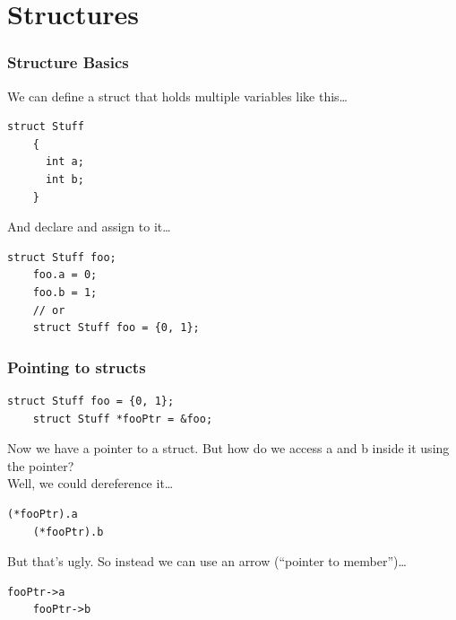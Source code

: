 \documentclass{beamer}
\begin{document}
\section{Structures}
\begin{frame}[fragile] %
  \frametitle{Structure Basics}
  We can define a struct that holds multiple variables like this\dots
  \begin{lstlisting}[style=customc]
    struct Stuff
    {
      int a;
      int b;
    }
  \end{lstlisting}
  \pause
  And declare and assign to it\dots
  \begin{lstlisting}[style=customc]
    struct Stuff foo;
    foo.a = 0;
    foo.b = 1;
    // or
    struct Stuff foo = {0, 1};
  \end{lstlisting}
\end{frame}
\begin{frame}[fragile]
  \frametitle{Pointing to structs}
  \begin{lstlisting}[style=customc]
    struct Stuff foo = {0, 1};
    struct Stuff *fooPtr = &foo;
  \end{lstlisting}
  Now we have a pointer to a struct. But how do we access a and b inside it using the pointer?\\
  \pause
  Well, we could dereference it\dots
  \begin{lstlisting}[style=customc]
    (*fooPtr).a
    (*fooPtr).b
  \end{lstlisting}
  But that's ugly. So instead we can use an arrow (``pointer to member'')\dots
  \begin{lstlisting}[style=customc]
    fooPtr->a
    fooPtr->b
  \end{lstlisting}
\end{frame}
\end{document}
